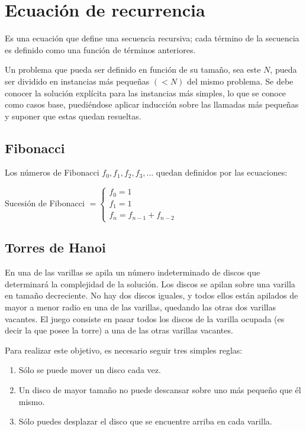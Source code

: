 \documentclass[a4paper, twoside]{article}
\begin{document}
\newpage
\section{Ecuación de recurrencia}
Es una ecuación que define una secuencia recursiva; cada término de la secuencia es definido como una función de términos anteriores.

Un problema que pueda ser definido en función de su tamaño, sea este $N$, pueda ser dividido en instancias más pequeñas $(< N)$ del mismo problema.
Se debe conocer la solución explícita para las instancias más simples, lo que se conoce como casos base, puediéndose aplicar inducción sobre las llamadas más pequeñas y suponer que estas quedan resueltas.

\subsection{Fibonacci}
Los números de Fibonacci $f_0,f_1,f_2,f_3,\dots$ quedan definidos por las ecuaciones:\\

\begin{center}
	Sucesión de Fibonacci $= \left\{ \begin{array}{c}
	f_0 = 1\\
	f_1 = 1\\
	f_n = f_{n-1} + f_{n-2}
	\end{array}\right.$
\end{center}

\subsection{Torres de Hanoi}
En una de las varillas se apila un número indeterminado de discos que determinará la complejidad de la solución.
Los discos se apilan sobre una varilla en tamaño decreciente. No hay dos discos iguales, y todos ellos están apilados de mayor a menor radio en una de las varillas, quedando las otras dos varillas vacantes. 
El juego consiste en pasar todos los discos de la varilla ocupada (es decir la que posee la torre) a una de las otras varillas vacantes. 

Para realizar este objetivo, es necesario seguir tres simples reglas:
\begin{enumerate}
	\item Sólo se puede mover un disco cada vez.
	\item Un disco de mayor tamaño no puede descansar sobre uno más pequeño que él mismo.
	\item Sólo puedes desplazar el disco que se encuentre arriba en cada varilla.
\end{enumerate}
\end{document}
